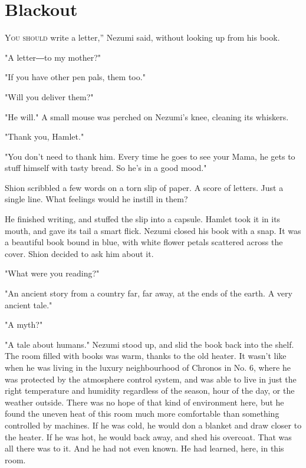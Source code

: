 
\chapter{Blackout}


\lettrine[ante=``]{Y}{ou should} write a letter,'' Nezumi said, without looking up from his
book.

"A letter―to my mother?"

"If you have other pen pals, them too."

"Will you deliver them?"

"He will." A small mouse was perched on Nezumi's knee, cleaning its
whiskers.

"Thank you, Hamlet."

"You don't need to thank him. Every time he goes to see your Mama, he
gets to stuff himself with tasty bread. So he's in a good mood."

Shion scribbled a few words on a torn slip of paper. A score of letters.
Just a single line. What feelings would he instill in them?

He finished writing, and stuffed the slip into a capsule. Hamlet took it
in its mouth, and gave its tail a smart flick. Nezumi closed his book
with a snap. It was a beautiful book bound in blue, with white flower
petals scattered across the cover. Shion decided to ask him about it.

"What were you reading?"

"An ancient story from a country far, far away, at the ends of the
earth. A very ancient tale."

"A myth?"

"A tale about humans." Nezumi stood up, and slid the book back into the
shelf. The room filled with books was warm, thanks to the old heater. It
wasn't like when he was living in the luxury neighbourhood of Chronos in
No. 6, where he was protected by the atmosphere control system, and was
able to live in just the right temperature and humidity regardless of
the season, hour of the day, or the weather outside. There was no hope
of that kind of environment here, but he found the uneven heat of this
room much more comfortable than something controlled by machines. If he
was cold, he would don a blanket and draw closer to the heater. If he
was hot, he would back away, and shed his overcoat. That was all there
was to it. And he had not even known. He had learned, here, in this
room.

